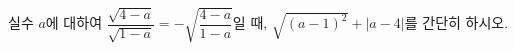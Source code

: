 실수 $a$에 대하여 $\dfrac{\sqrt{4-a}}{\sqrt{1-a}}=-\sqrt{\dfrac{4-a}{1-a}}$일 때, $\sqrt{(a-1)^2}+|a-4|$를 간단히 하시오. 
